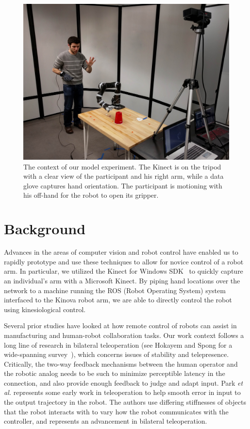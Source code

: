 \documentclass{sigchi}
\begin{document}
\begin{figure}[t]
	\centering
	\includegraphics[width=\columnwidth]{../Data/Figures/kinesiological_demo_2.jpg}
	\caption{The context of our model experiment.  The Kinect is on the tripod with a clear view of the participant and his right arm, while a data glove captures hand orientation.  The participant is motioning with his off-hand for the robot to open its gripper.}
	 \label{fig:demo}
\end{figure} 

\section{Background}

Advances in the areas of computer vision and robot control have enabled us to rapidly prototype and use these techniques to allow for novice control of a robot arm.  In particular, we utilized the Kinect for Windows SDK~\cite{Kinect} to quickly capture an individual's arm with a Microsoft Kinect.  By piping hand locations over the network to a machine running the ROS (Robot Operating System) system~\cite{ROS} interfaced to the Kinova robot arm, we are able to directly control the robot using kinesiological control.

Several prior studies have looked at how remote control of robots can assist in manufacturing and human-robot collaboration tasks. Our work context follows a long line of research in bilateral teleoperation (see Hokayem and Spong for a wide-spanning survey~\cite{hokayem2006bilateral}), which concerns issues of stability and telepresence.  Critically, the two-way feedback mechanisms between the human operator and the robotic analog needs to be such to minimize perceptible latency in the connection, and also provide enough feedback to judge and adapt input.  Park \emph{et al.} represents some early work in teleoperation to help smooth error in input to the output trajectory in the robot.  The authors use differing stiffnesses of objects that the robot interacts with to vary how the robot communicates with the controller, and represents an advancement in bilateral teleoperation.
\end{document}
